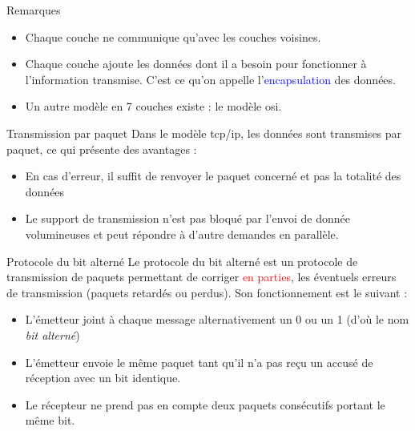 \documentclass[10pt]{beamer}
\begin{document}
\begin{frame}
	\mframe{\Reseau}
	\begin{block}{Remarques}
		\begin{itemize}
			\item<1-> Chaque couche  ne communique qu'avec les couches voisines.
			\item<2-> Chaque couche ajoute les données dont il a besoin pour fonctionner à l'information transmise. C'est ce qu'on appelle l'\textcolor{blue}{encapsulation} des données.
			\item<3-> Un autre modèle en 7 couches existe : le modèle {\sc osi}.
		\end{itemize}
	\end{block}
\end{frame}

\begin{frame}
	\mframe{\Reseau}
	\begin{alertblock}{Transmission par paquet}
		Dans le modèle {\sc tcp/ip}, les données sont transmises par paquet, ce qui présente des avantages :
		\begin{itemize}
			\item<1-> En cas d'erreur, il suffit de renvoyer le paquet concerné et pas la totalité des données
			\item<2-> Le support de transmission n'est pas bloqué par l'envoi de donnée volumineuses et peut répondre à d'autre demandes en parallèle.
		\end{itemize}
	\end{alertblock}
\end{frame}


\begin{frame}
	\mframe{\Reseau}
	\begin{alertblock}{Protocole du bit alterné}
    Le protocole du bit alterné est un protocole de transmission de paquets permettant de corriger \textcolor{red}{en parties}, les éventuels erreurs de transmission (paquets retardés ou perdus). Son fonctionnement est le suivant :
    \begin{itemize}
      \item<2-> L'émetteur joint à chaque message alternativement un 0 ou un 1 (d'où le nom \textit{bit alterné})
      \item<3-> L'émetteur envoie le même paquet tant qu'il n'a pas reçu un accusé de réception avec un bit identique.
      \item<4-> Le récepteur ne prend pas en compte deux paquets consécutifs portant le même bit.
    \end{itemize}
  \end{alertblock}
\end{frame}
\end{document}
